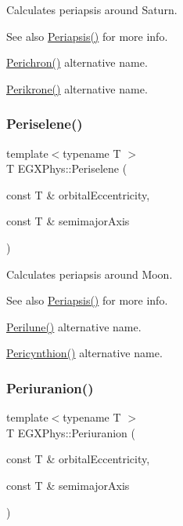 Calculates periapsis around Saturn. 

\begin{DoxySeeAlso}{See also}
\hyperlink{group___periapsis_ga4414ac75539371ec874a3d25cad6c9fe}{Periapsis()} for more info. 

\hyperlink{group___periapsis_ga12b5e99aa2e3e7031ef6ce93060cf516}{Perichron()} alternative name. 

\hyperlink{group___periapsis_gaa56f74c44a3583b8f0d13b821c1d7422}{Perikrone()} alternative name. 
\end{DoxySeeAlso}
\mbox{\label{group___periapsis_ga255874374dde571531e443cdbef9ef0c}} 
\subsubsection{\texorpdfstring{Periselene()}{Periselene()}}
{\footnotesize\ttfamily template$<$typename T $>$ \\
T E\+G\+X\+Phys\+::\+Periselene (\begin{DoxyParamCaption}\item[{const T \&}]{orbital\+Eccentricity,  }\item[{const T \&}]{semimajor\+Axis }\end{DoxyParamCaption})}



Calculates periapsis around Moon. 

\begin{DoxySeeAlso}{See also}
\hyperlink{group___periapsis_ga4414ac75539371ec874a3d25cad6c9fe}{Periapsis()} for more info. 

\hyperlink{group___periapsis_ga2cc7ab05e18d32c94d8d74972e032793}{Perilune()} alternative name. 

\hyperlink{group___periapsis_gaeeba153b188cd06cbd233eaef12f0a6a}{Pericynthion()} alternative name. 
\end{DoxySeeAlso}
\mbox{\label{group___periapsis_gab8b8131a617dd2d2a4de1d48accd7442}} 
\subsubsection{\texorpdfstring{Periuranion()}{Periuranion()}}
{\footnotesize\ttfamily template$<$typename T $>$ \\
T E\+G\+X\+Phys\+::\+Periuranion (\begin{DoxyParamCaption}\item[{const T \&}]{orbital\+Eccentricity,  }\item[{const T \&}]{semimajor\+Axis }\end{DoxyParamCaption})}



